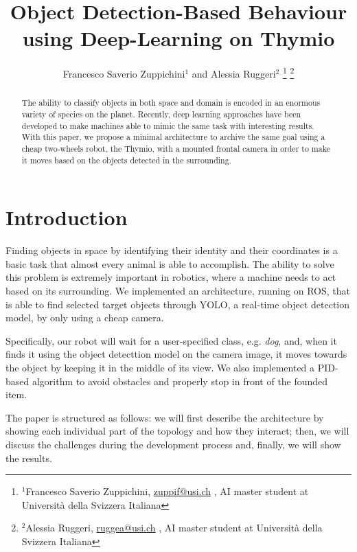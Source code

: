\documentclass[letterpaper, 10 pt, conference]{ieeeconf}  %
\title{\LARGE \bf
Object Detection-Based Behaviour using Deep-Learning on Thymio
}
\author{Francesco Saverio Zuppichini$^{1}$ and Alessia Ruggeri$^{2}$%
\thanks{$^{1}$Francesco Saverio Zuppichini, \href{mailto:zuppif@usi.ch}{zuppif@usi.ch} , AI master student at Università della Svizzera Italiana }%
\thanks{$^{2}$Alessia Ruggeri, \href{mailto:ruggea@usi.ch}{ruggea@usi.ch} , AI master student at Università della Svizzera Italiana }%
}
\begin{document}
\maketitle
\thispagestyle{empty}
\pagestyle{empty}


\begin{abstract}
The ability to classify objects in both space and domain is encoded in an enormous variety of species on the planet. Recently, deep learning approaches have been developed to make machines able to mimic the same task with interesting results. With this paper, we propose a minimal architecture to archive the same goal using a cheap two-wheels robot, the Thymio, with a mounted frontal camera in order to make it moves based on the objects detected in the surrounding. 
\end{abstract}

\section{Introduction}
Finding objects in space by identifying their identity and their coordinates is a basic task that almost every animal is able to accomplish. The ability to solve this problem is extremely important in robotics, where a machine needs to act based on its surrounding.  We implemented an architecture, running on ROS, that is able to find selected target objects through YOLO, a real-time object detection model,  by only using a cheap camera.

Specifically, our robot will wait for a user-specified class, e.g. \emph{dog}, and, when it finds it using the object detecttion model on the camera image, it moves towards the object by keeping it in the middle of its view. We also implemented a PID-based algorithm to avoid obstacles and properly stop in front of the founded item.

The paper is structured as follows: we will first describe the architecture by showing each individual part of the topology and how they interact; then, we will discuss the challenges during the development process and, finally, we will show the results.
\end{document}
